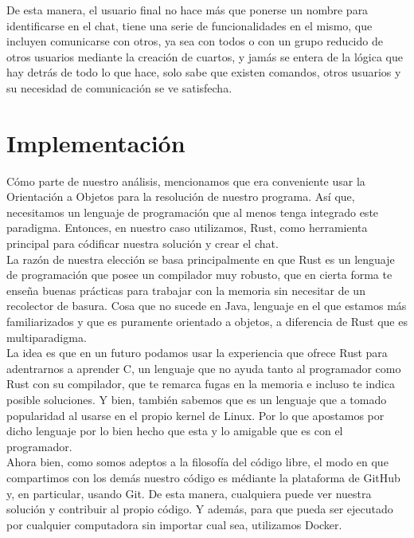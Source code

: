 \documentclass{article}
\begin{document}
De esta manera, el usuario final no hace más que ponerse un nombre para identificarse en el chat, tiene una serie de funcionalidades en el mismo, que incluyen comunicarse con otros, ya sea con todos o con un grupo reducido de otros usuarios mediante la creación de cuartos, y jamás se entera de la lógica que hay detrás de todo lo que hace, solo sabe que existen comandos, otros usuarios y su necesidad de comunicación se ve satisfecha.\\

\section*{Implementación}

Cómo parte de nuestro análisis, mencionamos que era conveniente usar la Orientación a Objetos para la resolución de nuestro programa. Así que, necesitamos un lenguaje de programación que al menos tenga integrado este paradigma. Entonces, en nuestro caso utilizamos, Rust, como herramienta principal para códificar nuestra solución y crear el chat.\\

La razón de nuestra elección se basa principalmente en que Rust es un lenguaje de programación que posee un compilador muy robusto, que en cierta forma te enseña buenas prácticas para trabajar con la memoria sin necesitar de un recolector de basura. Cosa que no sucede en Java, lenguaje en el que estamos más familiarizados y que es puramente orientado a objetos, a diferencia de Rust que es multiparadigma.\\

La idea es que en un futuro podamos usar la experiencia que ofrece Rust para adentrarnos a aprender C, un lenguaje que no ayuda tanto al programador como Rust con su compilador, que te remarca fugas en la memoria e incluso te indica posible soluciones. Y bien, también sabemos que es un lenguaje que a tomado popularidad al usarse en el propio kernel de Linux. Por lo que apostamos por dicho lenguaje por lo bien hecho que esta y lo amigable que es con el programador.\\

Ahora bien, como somos adeptos a la filosofía del código libre, el modo en que compartimos con los demás nuestro código es médiante la plataforma de GitHub y, en particular, usando Git. De esta manera, cualquiera puede ver nuestra solución y contribuir al propio código. Y además, para que pueda ser ejecutado por cualquier computadora sin importar cual sea, utilizamos Docker.\\
\end{document}
